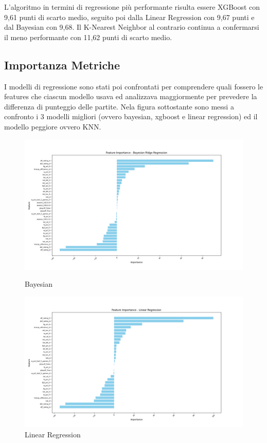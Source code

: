 L'algoritmo in termini di regressione più performante risulta essere XGBoost con 9,61 punti di scarto medio, seguito poi dalla Linear Regression con 9,67 punti e dal Bayesian con 9,68.
Il K-Nearest Neighbor al contrario continua a confermarsi il meno performante con 11,62 punti di scarto medio.

\subsection{Importanza Metriche}
I modelli di regressione sono stati poi confrontati per comprendere quali fossero le features che ciascun modello usava ed analizzava maggiormente per prevedere la differenza di punteggio delle partite. Nela figura sottostante sono messi a confronto i 3 modelli migliori (ovvero bayesian, xgboost e linear regression) ed il modello peggiore ovvero KNN.

\begin{figure}[H]
    \centering
    \begin{minipage}[b]{0.45\linewidth}
        \centering
        \includegraphics[width=\linewidth]{img/bayesian.png}
        \caption{Bayesian}
        \label{fig:first_label}
    \end{minipage}
    \hspace{0.05\linewidth}
    \begin{minipage}[b]{0.45\linewidth}
        \centering
        \includegraphics[width=\linewidth]{img/linear_regression.png}
        \caption{Linear Regression}
        \label{fig:second_label}
    \end{minipage}
\end{figure}

